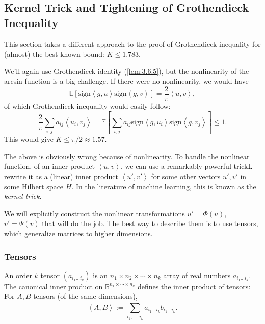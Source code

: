 \subsection{Kernel Trick and Tightening of Grothendieck Inequality}
This section takes a different approach to the proof of Grothendieck inequality for (almost) the best known 
bound: $K \leq 1.783$.

We'll again use Grothendieck identity (\cref{lem:3.6.5}), but the nonlinearity of the arcsin function is a big 
challenge. If there were no nonlinearity, we would have
\[ \mathbb{E}\left[ \mathrm{sign}\left\langle g, u \right\rangle 
\mathrm{sign}\left\langle g, v \right\rangle \right] = \frac{2}{\pi}\left\langle u, v \right\rangle, \]
of which Grothendieck inequality would easily follow:
\[ \frac{2}{\pi}\sum_{i, j}^{}a_{ij}\left\langle u_i, v_j \right\rangle 
= \mathbb{E}\left[ \sum_{i, j}^{}a_{ij}\mathrm{sign}\left\langle g, u_i \right\rangle 
\mathrm{sign}\left\langle g, v_j \right\rangle \right] \leq 1. \]
This would give $K \leq \pi / 2 \approx 1.57$.

The above is obviously wrong because of nonlinearity. To handle the nonlinear function, of an inner product 
$\left\langle u, v \right\rangle$, we can use a remarkably powerful trickL rewrite it as a (linear) inner 
product $\left\langle u', v' \right\rangle$ for some other vectors $u', v'$ in some Hilbert space $H$. In the 
literature of machine learning, this is known as the \textit{kernel trick}.

We will explicitly construct the nonlinear transformations $u' = \Phi(u)$, $v' = \Psi(v)$ that will do the job. 
The best way to describe them is to use tensors, which generalize matrices to higher dimensions.


\subsubsection{Tensors}
\begin{definition}[]
\label{def:3.7.1}
An \underline{order $k$ tensor} $(a_{i_1 \dots i_k})$ is an $n_1 \times n_2 \times \cdots \times n_k$ array 
of real numbers $a_{i_1 \dots i_k}$. The canonical inner product on $\mathbb{R}^{n_1 \times \cdots \times n_k}$ 
defines the inner product of tensors: For $A, B$ tensors (of the same dimensions), 
\[ \left\langle A, B \right\rangle := \sum_{i_1, \dots, i_k}^{} a_{i_1 \dots i_k} b_{i_1 \dots i_k}. \]
\end{definition}

